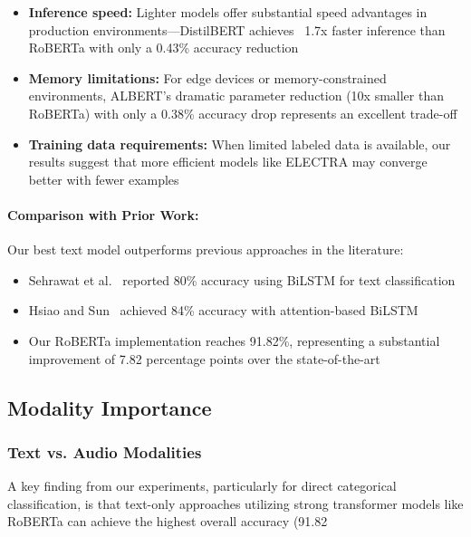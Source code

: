 \documentclass[12pt]{article}
\begin{document}
\begin{itemize}
\begin{itemize}
    \item \textbf{Inference speed:} Lighter models offer substantial speed advantages in production environments—DistilBERT achieves ~1.7x faster inference than RoBERTa with only a 0.43\% accuracy reduction

    \item \textbf{Memory limitations:} For edge devices or memory-constrained environments, ALBERT's dramatic parameter reduction (10x smaller than RoBERTa) with only a 0.38\% accuracy drop represents an excellent trade-off

    \item \textbf{Training data requirements:} When limited labeled data is available, our results suggest that more efficient models like ELECTRA may converge better with fewer examples
\end{itemize}

\paragraph{Comparison with Prior Work:}
Our best text model outperforms previous approaches in the literature:
\begin{itemize}
    \item Sehrawat et al.~\cite{sehrawat2023deception} reported 80\% accuracy using BiLSTM for text classification
    \item Hsiao and Sun~\cite{hsiao2022attention} achieved 84\% accuracy with attention-based BiLSTM
    \item Our RoBERTa implementation reaches 91.82\%, representing a substantial improvement of 7.82 percentage points over the state-of-the-art
\end{itemize}

\subsection{Modality Importance}
\subsubsection{Text vs. Audio Modalities}
A key finding from our experiments, particularly for direct categorical classification, is that text-only approaches utilizing strong transformer models like RoBERTa can achieve the highest overall accuracy (91.82%


\end{itemize}
\end{document}
